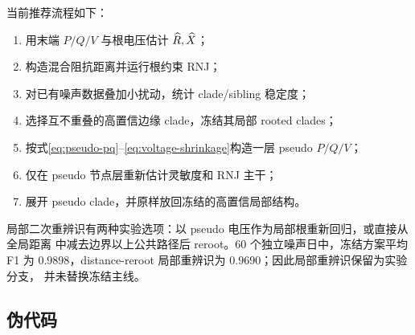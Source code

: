 当前推荐流程如下：
\begin{enumerate}
  \item 用末端 $P/Q/V$ 与根电压估计 $\widehat{R},\widehat{X}$；
  \item 构造混合阻抗距离并运行根约束 RNJ；
  \item 对已有噪声数据叠加小扰动，统计 clade/sibling 稳定度；
  \item 选择互不重叠的高置信边缘 clade，冻结其局部 rooted clades；
  \item 按式\eqref{eq:pseudo-pq}--\eqref{eq:voltage-shrinkage}构造一层 pseudo $P/Q/V$；
  \item 仅在 pseudo 节点层重新估计灵敏度和 RNJ 主干；
  \item 展开 pseudo clade，并原样放回冻结的高置信局部结构。
\end{enumerate}

局部二次重辨识有两种实验选项：以 pseudo 电压作为局部根重新回归，或直接从全局距离
中减去边界以上公共路径后 reroot。60 个独立噪声日中，冻结方案平均 F1 为
$0.9898$，distance-reroot 局部重辨识为 $0.9690$；因此局部重辨识保留为实验分支，
并未替换冻结主线。

\subsection{伪代码}

\begin{center}
\end{center}
